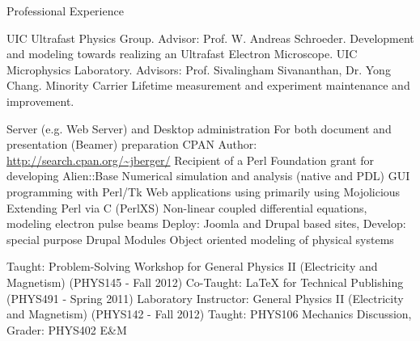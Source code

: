 \begin{rubric}{Professional Experience}


  \entry*[2005 --- \ldots] UIC Ultrafast Physics Group. Advisor: Prof. W. Andreas Schroeder. Development and modeling towards realizing an Ultrafast Electron Microscope.
  \entry*[2003 --- 2005] UIC Microphysics Laboratory. Advisors: Prof. Sivalingham Sivananthan, Dr. Yong Chang. Minority Carrier Lifetime measurement and experiment maintenance and improvement.


  \entry*[Linux] Server (e.g. Web Server) and Desktop administration
  \entry*[\LaTeX] For both document and presentation (Beamer) preparation
  \entry*[Perl] CPAN Author: \url{http://search.cpan.org/~jberger/}
  \entry*[Perl] Recipient of a Perl Foundation grant for developing Alien::Base
  \entry*[Perl] Numerical simulation and analysis (native and PDL)
  \entry*[Perl] GUI programming with Perl/Tk
  \entry*[Perl] Web applications using primarily using Mojolicious
  \entry*[Perl] Extending Perl via C (PerlXS)
  \entry*[Mathematica] Non-linear coupled differential equations, modeling electron pulse beams
  \entry*[PHP] Deploy: Joomla and Drupal based sites, Develop: special purpose Drupal Modules
  \entry*[Modelica] Object oriented modeling of physical systems
  

  \entry*[Teaching] Taught: Problem-Solving Workshop for General Physics II (Electricity and Magnetism) (PHYS145 - Fall 2012) 
  \entry*[Teaching] Co-Taught: \LaTeX{} for Technical Publishing (PHYS491 - Spring 2011)
  \entry*[T.A.] Laboratory Instructor: General Physics II (Electricity and Magnetism) (PHYS142 - Fall 2012)
  \entry*[T.A.] Taught: PHYS106 Mechanics Discussion, Grader: PHYS402 E\&M

\end{rubric}
